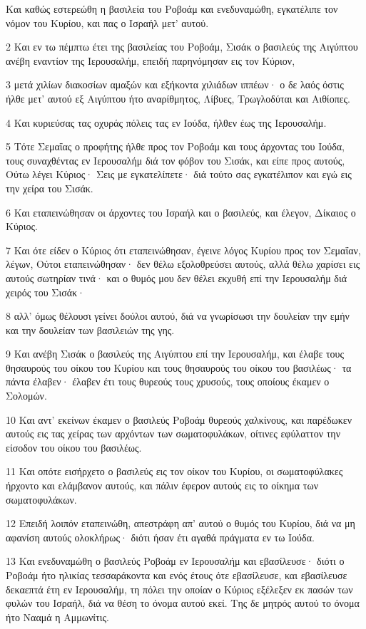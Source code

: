 \par Και καθώς εστερεώθη η βασιλεία του Ροβοάμ και ενεδυναμώθη, εγκατέλιπε τον νόμον του Κυρίου, και πας ο Ισραήλ μετ' αυτού.
\par 2 Και εν τω πέμπτω έτει της βασιλείας του Ροβοάμ, Σισάκ ο βασιλεύς της Αιγύπτου ανέβη εναντίον της Ιερουσαλήμ, επειδή παρηνόμησαν εις τον Κύριον,
\par 3 μετά χιλίων διακοσίων αμαξών και εξήκοντα χιλιάδων ιππέων· ο δε λαός όστις ήλθε μετ' αυτού εξ Αιγύπτου ήτο αναρίθμητος, Λίβυες, Τρωγλοδύται και Αιθίοπες.
\par 4 Και κυριεύσας τας οχυράς πόλεις τας εν Ιούδα, ήλθεν έως της Ιερουσαλήμ.
\par 5 Τότε Σεμαΐας ο προφήτης ήλθε προς τον Ροβοάμ και τους άρχοντας του Ιούδα, τους συναχθέντας εν Ιερουσαλήμ διά τον φόβον του Σισάκ, και είπε προς αυτούς, Ούτω λέγει Κύριος· Σεις με εγκατελίπετε· διά τούτο σας εγκατέλιπον και εγώ εις την χείρα του Σισάκ.
\par 6 Και εταπεινώθησαν οι άρχοντες του Ισραήλ και ο βασιλεύς, και έλεγον, Δίκαιος ο Κύριος.
\par 7 Και ότε είδεν ο Κύριος ότι εταπεινώθησαν, έγεινε λόγος Κυρίου προς τον Σεμαΐαν, λέγων, Ούτοι εταπεινώθησαν· δεν θέλω εξολοθρεύσει αυτούς, αλλά θέλω χαρίσει εις αυτούς σωτηρίαν τινά· και ο θυμός μου δεν θέλει εκχυθή επί την Ιερουσαλήμ διά χειρός του Σισάκ·
\par 8 αλλ' όμως θέλουσι γείνει δούλοι αυτού, διά να γνωρίσωσι την δουλείαν την εμήν και την δουλείαν των βασιλειών της γης.
\par 9 Και ανέβη Σισάκ ο βασιλεύς της Αιγύπτου επί την Ιερουσαλήμ, και έλαβε τους θησαυρούς του οίκου του Κυρίου και τους θησαυρούς του οίκου του βασιλέως· τα πάντα έλαβεν· έλαβεν έτι τους θυρεούς τους χρυσούς, τους οποίους έκαμεν ο Σολομών.
\par 10 Και αντ' εκείνων έκαμεν ο βασιλεύς Ροβοάμ θυρεούς χαλκίνους, και παρέδωκεν αυτούς εις τας χείρας των αρχόντων των σωματοφυλάκων, οίτινες εφύλαττον την είσοδον του οίκου του βασιλέως.
\par 11 Και οπότε εισήρχετο ο βασιλεύς εις τον οίκον του Κυρίου, οι σωματοφύλακες ήρχοντο και ελάμβανον αυτούς, και πάλιν έφερον αυτούς εις το οίκημα των σωματοφυλάκων.
\par 12 Επειδή λοιπόν εταπεινώθη, απεστράφη απ' αυτού ο θυμός του Κυρίου, διά να μη αφανίση αυτούς ολοκλήρως· διότι ήσαν έτι αγαθά πράγματα εν τω Ιούδα.
\par 13 Και ενεδυναμώθη ο βασιλεύς Ροβοάμ εν Ιερουσαλήμ και εβασίλευσε· διότι ο Ροβοάμ ήτο ηλικίας τεσσαράκοντα και ενός έτους ότε εβασίλευσε, και εβασίλευσε δεκαεπτά έτη εν Ιερουσαλήμ, τη πόλει την οποίαν ο Κύριος εξέλεξεν εκ πασών των φυλών του Ισραήλ, διά να θέση το όνομα αυτού εκεί. Της δε μητρός αυτού το όνομα ήτο Νααμά η Αμμωνίτις.
